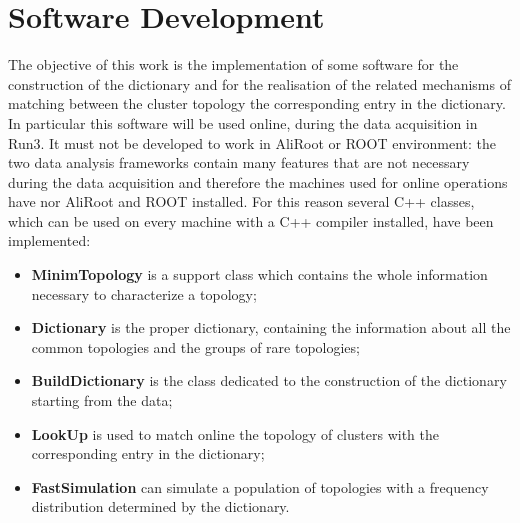 \section{Software Development}
The objective of this work is the implementation of some software for the construction of the dictionary and for the realisation of the related mechanisms of matching between the cluster topology the corresponding entry in the dictionary. In particular this software will be used online, during the data acquisition in Run3. It must not be developed to work in AliRoot or ROOT environment: the two data analysis frameworks contain many features that are not necessary during the data acquisition and therefore the machines used for online operations have nor AliRoot and ROOT installed. For this reason several C++ classes, which can be used on every machine with a C++ compiler installed, have been implemented:
\begin{itemize}
 \item \textbf{MinimTopology} is a support class which contains the whole information necessary to characterize a topology;
 \item \textbf{Dictionary} is the proper dictionary, containing the information about all the common topologies and the groups of rare topologies;
 \item \textbf{BuildDictionary} is the class dedicated to the construction of the dictionary starting from the data;
 \item \textbf{LookUp} is used to match online the topology of clusters with the corresponding entry in the dictionary;
 \item \textbf{FastSimulation} can simulate a population of topologies with a frequency distribution determined by the dictionary. 
\end{itemize}
